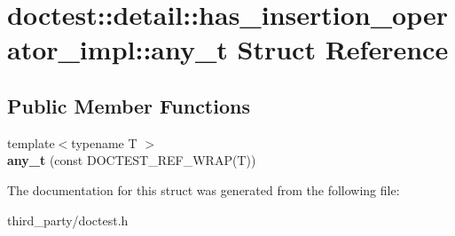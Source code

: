 \hypertarget{structdoctest_1_1detail_1_1has__insertion__operator__impl_1_1any__t}{}\section{doctest\+::detail\+::has\+\_\+insertion\+\_\+operator\+\_\+impl\+::any\+\_\+t Struct Reference}
\label{structdoctest_1_1detail_1_1has__insertion__operator__impl_1_1any__t}
\subsection*{Public Member Functions}
\begin{DoxyCompactItemize}
\item 
\mbox{\label{structdoctest_1_1detail_1_1has__insertion__operator__impl_1_1any__t_a253f4ce5a749ffd79ae9b1c68914e69b}} 
{\footnotesize template$<$typename T $>$ }\\{\bfseries any\+\_\+t} (const D\+O\+C\+T\+E\+S\+T\+\_\+\+R\+E\+F\+\_\+\+W\+R\+AP(T))
\end{DoxyCompactItemize}


The documentation for this struct was generated from the following file\+:\begin{DoxyCompactItemize}
\item 
third\+\_\+party/doctest.\+h\end{DoxyCompactItemize}

